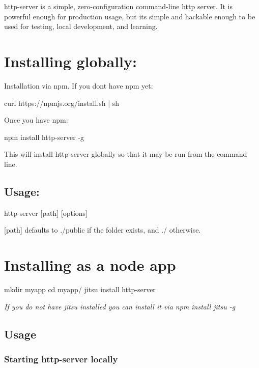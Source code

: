 {\ttfamily http-\/server} is a simple, zero-\/configuration command-\/line http server. It is powerful enough for production usage, but it\textquotesingle{}s simple and hackable enough to be used for testing, local development, and learning.



\section*{Installing globally\+:}

Installation via {\ttfamily npm}. If you don\textquotesingle{}t have {\ttfamily npm} yet\+: \begin{DoxyVerb} curl https://npmjs.org/install.sh | sh
\end{DoxyVerb}


Once you have {\ttfamily npm}\+: \begin{DoxyVerb} npm install http-server -g
\end{DoxyVerb}


This will install {\ttfamily http-\/server} globally so that it may be run from the command line.

\subsection*{Usage\+:}

\begin{DoxyVerb} http-server [path] [options]
\end{DoxyVerb}


{\ttfamily \mbox{[}path\mbox{]}} defaults to {\ttfamily ./public} if the folder exists, and {\ttfamily ./} otherwise.

\section*{Installing as a node app}

\begin{DoxyVerb} mkdir myapp
 cd myapp/
 jitsu install http-server
\end{DoxyVerb}


{\itshape If you do not have {\ttfamily jitsu} installed you can install it via {\ttfamily npm install jitsu -\/g}}

\subsection*{Usage}

\subsubsection*{Starting http-\/server locally}

